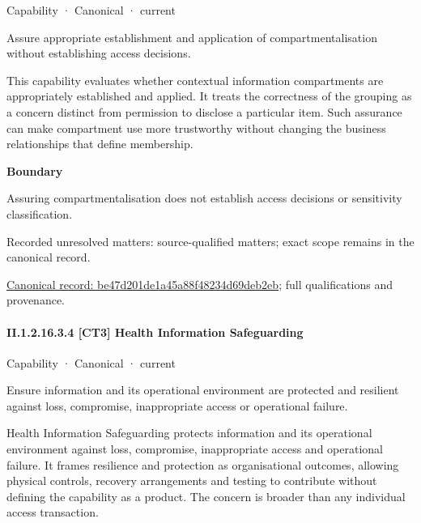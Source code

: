 \label{element:be47d201de1a45a88f48234d69deb2eb}
{\small Capability · Canonical · current}\par

Assure appropriate establishment and application of compartmentalisation without establishing access decisions.



This capability evaluates whether contextual information compartments are appropriately established and applied. It treats the correctness of the grouping as a concern distinct from permission to disclose a particular item. Such assurance can make compartment use more trustworthy without changing the business relationships that define membership.



\textbf{Boundary}



Assuring compartmentalisation does not establish access decisions or sensitivity classification.


{\small Recorded unresolved matters: source-qualified matters; exact scope remains in the canonical record.}\par
{\footnotesize \href{../../../../continuum/strategy/capability/be47d201de1a45a88f48234d69deb2eb.md}{Canonical record: be47d201de1a45a88f48234d69deb2eb}; full qualifications and provenance.}\par
\paragraph*{II.1.2.16.3.4 [CT3] Health Information Safeguarding}
\label{navigation:II.1.2.16.3.4}

\label{element:6e89db75de5b4c4c9274f78c8d9e665a}
{\small Capability · Canonical · current}\par

Ensure information and its operational environment are protected and resilient against loss, compromise, inappropriate access or operational failure.



Health Information Safeguarding protects information and its operational environment against loss, compromise, inappropriate access and operational failure. It frames resilience and protection as organisational outcomes, allowing physical controls, recovery arrangements and testing to contribute without defining the capability as a product. The concern is broader than any individual access transaction.



